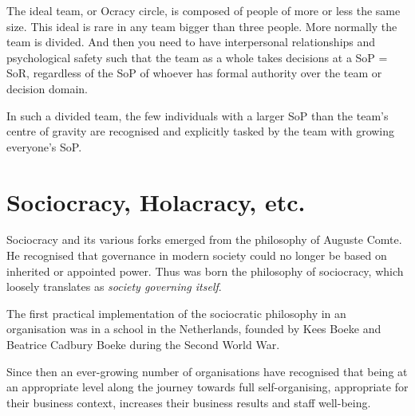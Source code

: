 The ideal team, or Ocracy circle, is composed of people of more or less the same size. This ideal is rare in any team bigger than three people. More normally the team is divided. And then you need to have interpersonal relationships and psychological safety such that the team as a whole takes decisions at a SoP = SoR, regardless of the SoP  of whoever has formal authority over the team or decision domain.


In such a divided team, the few individuals with a larger SoP than the team's centre of gravity are recognised and explicitly tasked by the team with growing everyone's SoP.


\section{Sociocracy, Holacracy, etc.}
Sociocracy and its various forks emerged from the philosophy of Auguste Comte.  He recognised that governance in modern society could no longer be based on inherited or appointed power. Thus was born the philosophy of sociocracy, which loosely translates as \emph{society governing itself}.


The first practical implementation of the sociocratic philosophy in an organisation was in a school in the Netherlands, founded by Kees Boeke and Beatrice Cadbury Boeke during the Second World War. 


Since then an ever-growing number of organisations have recognised that being at an appropriate level along the journey towards full self-organising, appropriate for their business context, increases their business results and staff well-being.


